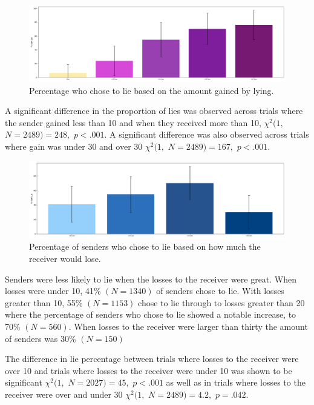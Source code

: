 \documentclass[man, floatsintext]{apa7}
\begin{document}
\begin{figure}[H]
	\includegraphics[width=\linewidth]{../plots/RESPONSE/NetGainLie.png}
	\caption{Percentage who chose to lie based on the amount gained by lying.}
	\label{fig:NetGainLie}
\end{figure}

A significant difference in the proportion of lies was observed across trials where the sender gained less than 10 and when they received more than 10, $\chi^2(1,$ $N=2489) = 248,$ $p<.001$. A significant difference was also observed across trials where gain was under 30 and over 30 $\chi^2(1,$ $N=2489) = 167,$ $p<.001$.

\begin{figure}[H]
	\includegraphics[width=\linewidth]{../plots/RESPONSE/NetLossLie.png}
	\caption{Percentage of senders who chose to lie based on how much the receiver would lose.}
	\label{fig:NetLossLie}
\end{figure}

Senders were less likely to lie when the losses to the receiver were great. When losses were under 10,  41\% $(N = 1340)$ of senders chose to lie. With losses greater than 10, 55\%  $(N = 1153)$ chose to lie through to losses greater than 20 where the percentage of senders who chose to lie showed a notable increase, to 70\%  $(N = 560)$. When losses to the receiver were larger than thirty the amount of senders was 30\% $(N = 150)$

The difference in lie percentage between trials where losses to the receiver were over 10 and trials where losses to the receiver were under 10 was shown to be significant $\chi^2(1,$ $N=2027) = 45,$ $p<.001$ as well as in trials where losses to the receiver were over and under 30 $\chi^2(1,$ $N=2489) = 4.2,$ $p=.042$.
\end{document}
